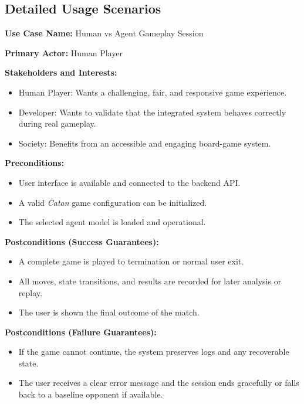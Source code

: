 \documentclass{article}
\begin{document}
\subsection{Detailed Usage Scenarios}\label{subsec:detailed-usage-scenarios}

\noindent\textbf{Use Case Name:} Human vs \RL{} Agent Gameplay Session

\noindent\textbf{Primary Actor:} Human Player

\noindent\textbf{Stakeholders and Interests:}
\begin{itemize}
    \item Human Player: Wants a challenging, fair, and responsive game experience.
    \item Developer: Wants to validate that the integrated system behaves correctly during real gameplay.
    \item Society: Benefits from an accessible and engaging board-game \AI{} system.
\end{itemize}

\noindent\textbf{Preconditions:}
\begin{itemize}
    \item User interface is available and connected to the backend API.
    \item A valid \emph{Catan} game configuration can be initialized.
    \item The selected \RL{} agent model is loaded and operational.
\end{itemize}

\noindent\textbf{Postconditions (Success Guarantees):}
\begin{itemize}
    \item A complete game is played to termination or normal user exit.
    \item All moves, state transitions, and results are recorded for later analysis or replay.
    \item The user is shown the final outcome of the match.
\end{itemize}

\noindent\textbf{Postconditions (Failure Guarantees):}
\begin{itemize}
    \item If the game cannot continue, the system preserves logs and any recoverable state.
    \item The user receives a clear error message and the session ends gracefully or falls back to a baseline opponent if available.
\end{itemize}
\end{document}
